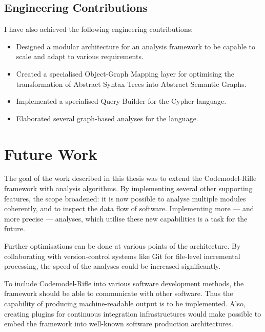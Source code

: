 \subsection{Engineering Contributions}

I have also achieved the following engineering contributions:

\begin{itemize}
\item Designed a modular architecture for an analysis framework to be capable to scale and adapt to various requirements.
\item Created a specialised Object-Graph Mapping layer for optimising the transformation of Abstract Syntax Trees into Abstract Semantic Graphs.
\item Implemented a specialised Query Builder for the Cypher language.
\item Elaborated several graph-based analyses for the \es language.
\end{itemize}


\section{Future Work}

The goal of the work described in this thesis was to extend the Codemodel-Rifle framework with analysis algorithms. By implementing several other supporting features, the scope broadened: it is now possible to analyse multiple modules coherently, and to inspect the data flow of \es software. Implementing more — and more precise — analyses, which utilise these new capabilities is a task for the future.

Further optimisations can be done at various points of the architecture. By collaborating with version-control systems like Git for file-level incremental processing, the speed of the analyses could be increased significantly.

To include Codemodel-Rifle into various software development methods, the framework should be able to communicate with other software. Thus the capability of producing machine-readable output is to be implemented. Also, creating plugins for continuous integration infrastructures would make possible to embed the framework into well-known software production architectures.